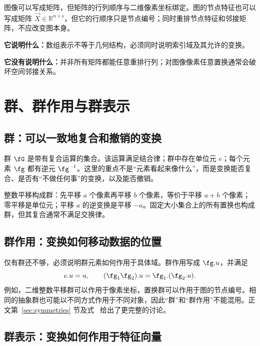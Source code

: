 \begin{tcolorbox}[width=\linewidth,colback=boxgray!35,colframe=darkgry,title=深度学习实例：同一个矩阵可能承担不同角色]
图像可以写成矩阵，但矩阵的行列顺序与二维像素坐标绑定。图的节点特征也可以写成矩阵 $\vec{X}\in\mathbb{R}^{n\times s}$，但它的行顺序只是节点编号；同时重排节点特征和邻接矩阵，不应改变图本身。

\textbf{它说明什么：}数组表示不等于几何结构，必须同时说明索引域及其允许的变换。

\textbf{它没有说明什么：}并非所有矩阵都能任意重排行列；对图像像素任意置换通常会破坏空间邻接关系。
\end{tcolorbox}

\section{群、群作用与群表示}
\label{app:primer:groups}

\subsection{群：可以一致地复合和撤销的变换}

群 $\fG$ 是带有复合运算的集合。该运算满足结合律；群中存在单位元 $e$；每个元素 $\fg$ 都有逆元 $\fg^{-1}$。这里的重点不是“元素看起来像什么”，而是变换能否复合、是否有“不做任何事”的变换，以及能否撤销。

整数平移构成群：先平移 $a$ 个像素再平移 $b$ 个像素，等价于平移 $a+b$ 个像素；零平移是单位元；平移 $a$ 的逆变换是平移 $-a$。固定大小集合上的所有置换也构成群，但其复合通常不满足交换律。

\subsection{群作用：变换如何移动数据的位置}

仅有群还不够，必须说明群元素如何作用于具体域。群作用写成 $\fg.u$，并满足
\begin{equation}
e.u=u,
\qquad
(\fg_1\fg_2).u=\fg_1.(\fg_2.u).
\label{app:primer:group-action}
\end{equation}
例如，二维整数平移群可以作用于像素坐标，置换群可以作用于图的节点编号。相同的抽象群也可能以不同方式作用于不同对象，因此“群”和“群作用”不能混用。正文第~\ref{sec:symmetries} 节及式~ 给出了更完整的讨论。

\subsection{群表示：变换如何作用于特征向量}

